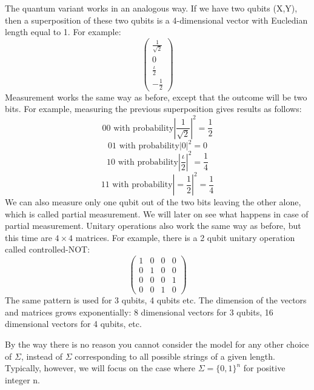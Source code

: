 The quantum variant works in an analogous way. If we have two qubits (X,Y), then a superposition of these two qubits is a 4-dimensional vector with Eucledian length equal to 1. For example:
\[
\begin{pmatrix} \frac{1}{\sqrt{2}} \\ 0 \\ \frac{\iota}{2} \\ -\frac{1}{2} \end{pmatrix}
\]
Measurement works the same way as before, except that the outcome will be two bits. For example, measuring the previous superposition gives results as follows:
\[
\text{00 with probability} |\frac{1}{\sqrt{2}}|^2=\frac{1}{2}
\]
\[
\text{01 with probability} |0|^2=0
\]
\[
\text{10 with probability} |\frac{\iota}{2}|^2=\frac{1}{4}
\]
\[
\text{11 with probability} |=\frac{1}{2}|^2=\frac{1}{4}
\]
We can also measure only one qubit out of the two bits leaving the other alone, which is called partial measurement. We will later on see what happens in case of partial measurement. Unitary operations also work the same way as before, but this time are $4 \times 4$ matrices. For example, there is a 2 qubit unitary operation called controlled-NOT:
\[
\begin{pmatrix} 1 & 0 & 0 & 0 \\ 0 & 1 & 0 & 0 \\ 0 & 0 & 0 & 1\\ 0 & 0 & 1 & 0 \end{pmatrix}
\]
The same pattern is used for 3 qubits, 4 qubits etc. The dimension of the vectors and matrices grows exponentially: 8 dimensional vectors for 3 qubits, 16 dimensional vectors for 4 qubits, etc.

By the way there is no reason you cannot consider the model for any other choice of $\Sigma$, instead of $\Sigma$ corresponding to all possible strings of a given length. Typically, however, we will focus on the case where $\Sigma=\{0,1\}^n$ for positive integer n.

